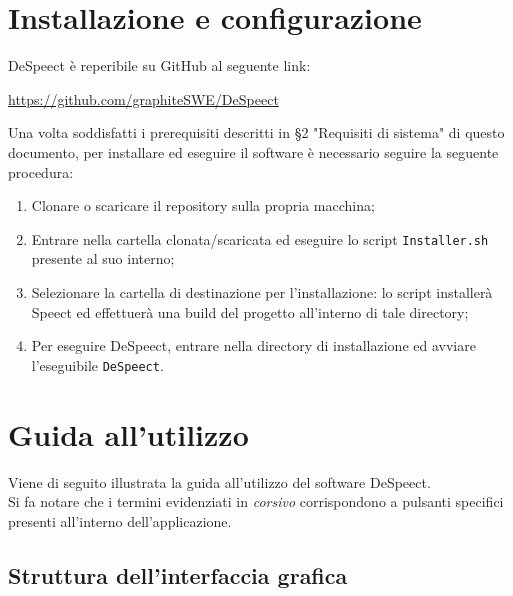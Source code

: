 \documentclass[openany,12pt,a4paper]{report}
\begin{document}
	 
	\chapter{Installazione e configurazione} 
	
	DeSpeect è reperibile su GitHub al seguente link:
	\begin{center}
		\url{https://github.com/graphiteSWE/DeSpeect}
	\end{center}
	
	\noindent Una volta soddisfatti i prerequisiti descritti in §2 "Requisiti di sistema" di questo documento, per installare ed eseguire il software è necessario seguire la seguente procedura:
	\begin{enumerate}
		\item Clonare o scaricare il repository sulla propria macchina;
		\item Entrare nella cartella clonata/scaricata ed eseguire lo script \verb|Installer.sh| presente al suo interno;
		\item Selezionare la cartella di destinazione per l'installazione: lo script installerà Speect ed effettuerà una build del progetto all'interno di tale directory;
		\item Per eseguire DeSpeect, entrare nella directory di installazione ed avviare l'eseguibile \verb|DeSpeect|.
	\end{enumerate}
	
	\chapter{Guida all'utilizzo}
	Viene di seguito illustrata la guida all'utilizzo del software DeSpeect. \\
	Si fa notare che i termini evidenziati in \textit{corsivo} corrispondono a pulsanti specifici presenti all'interno dell'applicazione.
	
	\section{Struttura dell'interfaccia grafica}
	
\end{document}
